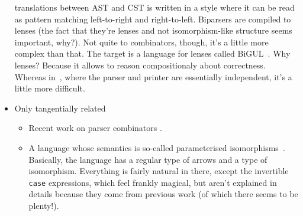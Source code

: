 \documentclass[sigplan,review,dvipsnames,screen,10pt]{acmart}
\begin{document}
\begin{itemize}
  translations between AST and CST is written in a style where it can
  be read as pattern matching left-to-right and
  right-to-left. Biparsers are compiled to lenses (the fact that
  they're lenses and not isomorphism-like structure seems important,
  why?). Not quite to combinators, though, it's a little more complex
  than that. The target is a language for lenses called
  BiGUL~\cite{bigul}. Why lenses? Because it allows to reason
  compositionaly about correctness. Whereas
  in~\cite{monadic-profunctors}, where the parser and printer are
  essentially independent, it's a little more difficult.
\item Only tangentially related
  \begin{itemize}
  \item Recent work on parser combinators
    \cite{parsley,parsec-design-patterns}.
  \item A language whose semantics is so-called parameterised
    isomorphisms~\cite{parameterised-isomorphism}. Basically, the
    language has a regular type of arrows and a type of
    isomorphism. Everything is fairly natural in there, except the
    invertible \verb+case+ expressions, which feel frankly magical,
    but aren't explained in details because they come from previous
    work (of which there seems to be plenty!).
  \end{itemize}
\end{itemize}


{}
\end{document}
